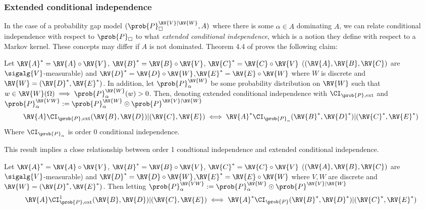 
\subsubsection{Extended conditional independence}


In the case of a probability gap model $(\prob{P}_{\square}^{\RV{V}|\RV{W}},A)$ where there is some $\alpha\in A$ dominating $A$, we can relate conditional independence with respect to $\prob{P}_\square$ to what \citet{constantinou_extended_2017} \emph{extended conditional independence}, which is a notion they define with respect to a Markov kernel. These concepts may differ if $A$ is not dominated. Theorem 4.4 of \citet{constantinou_extended_2017} proves the following claim:

\begin{theorem}\label{th:dawid_constantionou}
Let $\RV{A}^*=\RV{A}\circ \RV{V}$, $\RV{B}^*=\RV{B}\circ\RV{V}$, $\RV{C}^*=\RV{C}\circ \RV{V}$ ($(\RV{A},\RV{B},\RV{C})$ are $\sigalg{V}$-measurable) and $\RV{D}^*=\RV{D}\circ \RV{W}$,$\RV{E}^*=\RV{E}\circ \RV{W}$ where $W$ is discrete and $\RV{W}=(\RV{D}^*,\RV{E}^*)$. In addition, let $\prob{P}_\alpha^{\RV{W}}$ be some probability distribution on $\RV{W}$ such that $w\in\RV{W}(\Omega)\implies \prob{P}_\alpha^{\RV{W}}(w)>0$. Then, denoting extended conditional independence with $\CI_{\prob{P},\text{ext}}$ and $\prob{P}_\alpha^{\RV{VW}}:=\prob{P}_\alpha^{\RV{W}}\odot \prob{P}^{\RV{V}|\RV{W}}$
\begin{align}
    \RV{A}\CI_{\prob{P},\text{ext}}(\RV{B},\RV{D})|(\RV{C},\RV{E})\iff \RV{A}^*\CI_{\prob{P}_\alpha}(\RV{B}^*,\RV{D}^*)|(\RV{C}^*,\RV{E}^*)
\end{align}
Where $\CI_{\prob{P}_\alpha}$ is order 0 conditional independence.
\end{theorem}

This result implies a close relationship between order 1 condtional independence and extended conditional independence.

\begin{theorem}
Let $\RV{A}^*=\RV{A}\circ \RV{V}$, $\RV{B}^*=\RV{B}\circ\RV{V}$, $\RV{C}^*=\RV{C}\circ \RV{V}$ ($(\RV{A},\RV{B},\RV{C})$ are $\sigalg{V}$-measurable) and $\RV{D}^*=\RV{D}\circ \RV{W}$,$\RV{E}^*=\RV{E}\circ \RV{W}$ where $V,W$ are discrete and $\RV{W}=(\RV{D}^*,\RV{E}^*)$. Then letting $\prob{P}_\alpha^{\RV{VW}}:=\prob{P}_\alpha^{\RV{W}}\odot \prob{P}^{\RV{V}|\RV{W}}$
\begin{align}
    \RV{A}\CI^1_{\prob{P},\text{ext}}(\RV{B},\RV{D})|(\RV{C},\RV{E})\iff \RV{A}^*\CI_{\prob{P}}(\RV{B}^*,\RV{D}^*)|(\RV{C}^*,\RV{E}^*)
\end{align}
\end{theorem}


